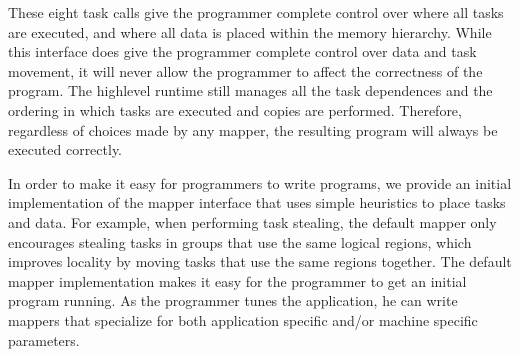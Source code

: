 




These eight task calls give the programmer complete control over where all tasks are executed, and
where all data is placed within the memory hierarchy.  While this interface does give the programmer
complete control over data and task movement, it will never allow the programmer to affect the
correctness of the program.  The highlevel runtime still manages all the task dependences and the
ordering in which tasks are executed and copies are performed.  Therefore, regardless of choices
made by any mapper, the resulting program will always be executed correctly.

In order to make it easy for programmers to write programs, we provide an initial implementation 
of the mapper interface that uses simple heuristics to place tasks and data.  For example, when
performing task stealing, the default mapper only encourages stealing tasks in groups that use
the same logical regions, which improves locality by moving tasks that use the same regions
together.  The default mapper implementation makes it easy for the programmer to get an 
initial program running.  As the programmer tunes the application, he can write mappers that
specialize for both application specific and/or machine specific parameters.

